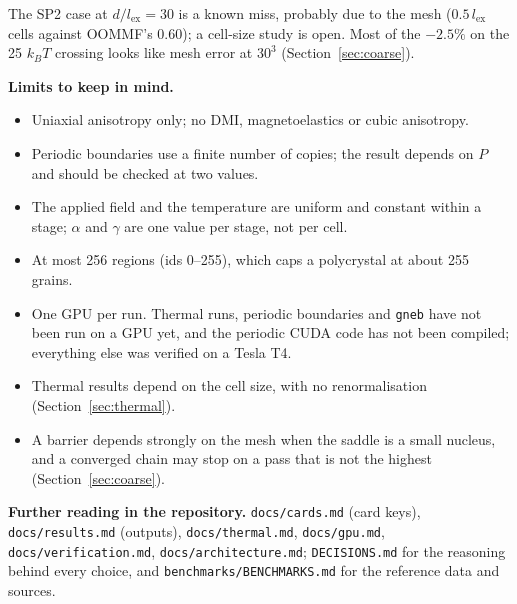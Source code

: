 \documentclass[10pt,a4paper]{article}
\newcommand{\code}[1]{\texttt{#1}}
\begin{document}
The SP2 case at $d/l_\mathrm{ex}=30$ is a known miss, probably due to the mesh ($0.5\,l_\mathrm{ex}$ cells against
OOMMF's 0.60); a cell-size study is open. Most of the $-2.5\%$ on the 25 $k_BT$ crossing looks like mesh error at $30^3$
(Section~\ref{sec:coarse}).

\textbf{Limits to keep in mind.}
\begin{itemize}
  \item Uniaxial anisotropy only; no DMI, magnetoelastics or cubic anisotropy.
  \item Periodic boundaries use a finite number of copies; the result depends on $P$ and should be checked at two values.
  \item The applied field and the temperature are uniform and constant within a stage; $\alpha$ and $\gamma$ are one
        value per stage, not per cell.
  \item At most 256 regions (ids 0--255), which caps a polycrystal at about 255 grains.
  \item One GPU per run. Thermal runs, periodic boundaries and \code{gneb} have not been run on a GPU yet, and the
        periodic CUDA code has not been compiled; everything else was verified on a Tesla T4.
  \item Thermal results depend on the cell size, with no renormalisation (Section~\ref{sec:thermal}).
  \item A barrier depends strongly on the mesh when the saddle is a small nucleus, and a converged chain may stop on a pass
        that is not the highest (Section~\ref{sec:coarse}).
\end{itemize}

\textbf{Further reading in the repository.} \code{docs/cards.md} (card keys), \code{docs/results.md} (outputs),
\code{docs/thermal.md}, \code{docs/gpu.md}, \code{docs/verification.md}, \code{docs/architecture.md};
\code{DECISIONS.md} for the reasoning behind every choice, and \code{benchmarks/BENCHMARKS.md} for the reference data and sources.
\end{document}
